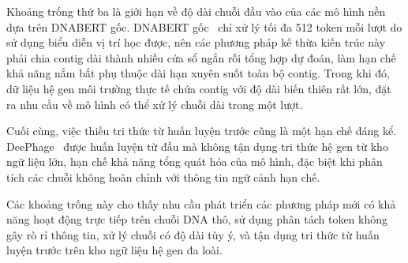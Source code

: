 Khoảng trống thứ ba là giới hạn về độ dài chuỗi đầu vào của các mô hình nền dựa trên DNABERT gốc. DNABERT gốc~\cite{ji2021dnabert} chỉ xử lý tối đa 512 token mỗi lượt do sử dụng biểu diễn vị trí học được, nên các phương pháp kế thừa kiến trúc này phải chia contig dài thành nhiều cửa sổ ngắn rồi tổng hợp dự đoán, làm hạn chế khả năng nắm bắt phụ thuộc dài hạn xuyên suốt toàn bộ contig. Trong khi đó, dữ liệu hệ gen môi trường thực tế chứa contig với độ dài biến thiên rất lớn, đặt ra nhu cầu về mô hình có thể xử lý chuỗi dài trong một lượt.

Cuối cùng, việc thiếu tri thức từ huấn luyện trước cũng là một hạn chế đáng kể. DeePhage~\cite{wu2021deephage} được huấn luyện từ đầu mà không tận dụng tri thức hệ gen từ kho ngữ liệu lớn, hạn chế khả năng tổng quát hóa của mô hình, đặc biệt khi phân tích các chuỗi không hoàn chỉnh với thông tin ngữ cảnh hạn chế.

Các khoảng trống này cho thấy nhu cầu phát triển các phương pháp mới có khả năng hoạt động trực tiếp trên chuỗi DNA thô, sử dụng phân tách token không gây rò rỉ thông tin, xử lý chuỗi có độ dài tùy ý, và tận dụng tri thức từ huấn luyện trước trên kho ngữ liệu hệ gen đa loài.
